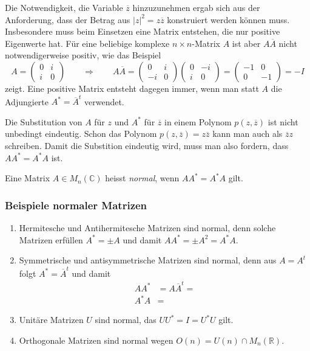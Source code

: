 Die Notwendigkeit, die Variable $\overline{z}$ hinzuzunehmen
ergab sich aus der Anforderung, dass der Betrag aus $|z|^2=z\overline{z}$
konstruiert werden können muss.
Insbesondere muss beim Einsetzen eine Matrix entstehen, die nur 
positive Eigenwerte hat.
Für eine beliebige komplexe $n\times n$-Matrix $A$ ist aber
$A\overline{A}$ nicht notwendigerweise positiv, wie das Beispiel
\[
A
=
\begin{pmatrix}0&i\\i&0\end{pmatrix}
\qquad
\Rightarrow
\qquad
A\overline{A}
=
\begin{pmatrix}0&i\\-i&0\end{pmatrix}
\begin{pmatrix}0&-i\\i&0\end{pmatrix}
=
\begin{pmatrix}
-1&0\\
 0&-1
\end{pmatrix}
=
-I
\]
zeigt.
Eine positive Matrix entsteht dagegen immer, wenn man statt
$A$ die Adjungierte $A^*=\overline{A}^t$ verwendet.

Die Substitution von $A$ für $z$ und $A^*$ für $\overline{z}$
in einem Polynom $p(z,\overline{z})$ ist nicht unbedingt eindeutig.
Schon das Polynom $p(z,\overline{z})=z\overline{z}$ kann man auch
als $\overline{z}z$ schreiben.
Damit die Substition eindeutig wird, muss man also fordern, dass
$AA^* = A^*A$ ist.

\begin{definition}
Eine Matrix $A\in M_n(\mathbb{C})$ heisst {\em normal}, wenn $AA^*=A^*A$ gilt.
\end{definition}

\subsubsection{Beispiele normaler Matrizen}

\begin{enumerate}
\item
Hermitesche und Antihermitesche Matrizen sind normal, denn solche
Matrizen erfüllen $A^*=\pm A$ und damit
\(
AA^* = \pm A^2 = A^*A.
\)
\item
Symmetrische und antisymmetrische Matrizen sind normal,
denn aus $A=A^t$ folgt $A^*=\overline{A}^t$ und damit
\begin{align*}
AA^* &=  A\overline{A}^t = 
\\
A^*A &=
\end{align*}
\item
Unitäre Matrizen $U$ sind normal, das $UU^*=I=U^*U$ gilt.
\item
Orthogonale Matrizen sind normal wegen $O(n) = U(n) \cap M_n(\mathbb{R})$.
\end{enumerate}

